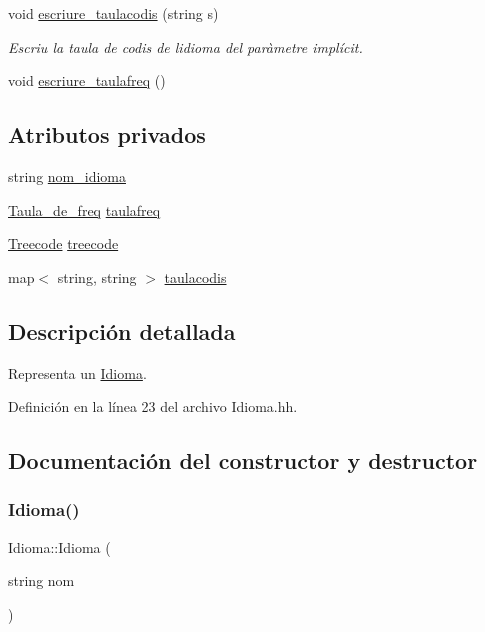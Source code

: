 \begin{DoxyCompactItemize}
void \hyperlink{class_idioma_a4f1102ff409d13738ff09268e8e045da}{escriure\+\_\+taulacodis} (string s)
\begin{DoxyCompactList}\small\item\em Escriu la taula de codis de l\textquotesingle{}idioma del paràmetre implícit. \end{DoxyCompactList}\item 
void \hyperlink{class_idioma_abb8d57bbf17437c67cf3860643e60386}{escriure\+\_\+taulafreq} ()
\end{DoxyCompactItemize}
\subsection*{Atributos privados}
\begin{DoxyCompactItemize}
\item 
string \hyperlink{class_idioma_a4f95caa662042f1404ab10319b50ee56}{nom\+\_\+idioma}
\item 
\hyperlink{class_taula__de__freq}{Taula\+\_\+de\+\_\+freq} \hyperlink{class_idioma_a51e5f7366342e04f3dae8a4f0fdcca60}{taulafreq}
\item 
\hyperlink{class_treecode}{Treecode} \hyperlink{class_idioma_ab80d7ef5fec4c922bc65e97e6e3bf968}{treecode}
\item 
map$<$ string, string $>$ \hyperlink{class_idioma_a8eb4228a5182a71efe31c110f2500723}{taulacodis}
\end{DoxyCompactItemize}


\subsection{Descripción detallada}
Representa un \hyperlink{class_idioma}{Idioma}. 

Definición en la línea 23 del archivo Idioma.\+hh.



\subsection{Documentación del constructor y destructor}
\mbox{\label{class_idioma_acb367feda82c466b5c61378636b901b6}} 
\subsubsection{\texorpdfstring{Idioma()}{Idioma()}}
{\footnotesize\ttfamily Idioma\+::\+Idioma (\begin{DoxyParamCaption}\item[{string}]{nom }\end{DoxyParamCaption})}



